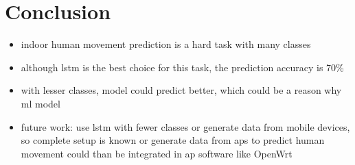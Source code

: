 \chapter{Conclusion}\label{sec:conclusion}

\begin{itemize}
    \item indoor human movement prediction is a hard task with many classes
    \item although \ac{lstm} is the best choice for this task, the prediction accuracy is 70\%
    \item with lesser classes, model could predict better, which could be a reason why \ac{ml} model 
    \item future work: use \ac{lstm} with fewer classes 
    \subitem or generate data from mobile devices, so complete setup is known
    \subitem or generate data from \acp{ap} to predict human movement 
    \subitem could than be integrated in \acs{ap} software like OpenWrt
\end{itemize}

